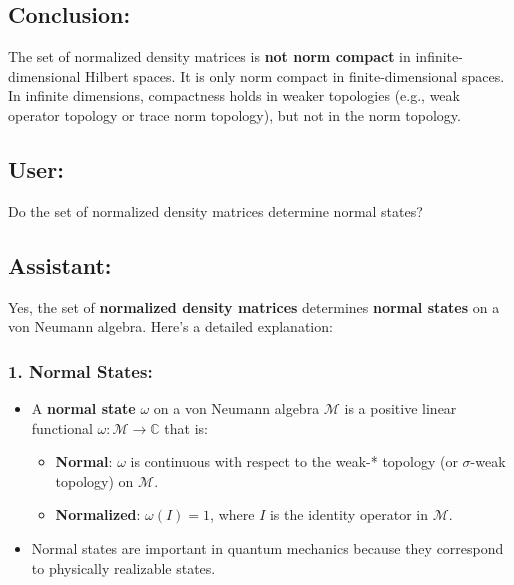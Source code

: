 \documentclass{article}
\begin{document}
\subsection*{Conclusion:}

The set of normalized density matrices is \textbf{not norm compact} in
infinite-dimensional Hilbert spaces. It is only norm compact in
finite-dimensional spaces. In infinite dimensions, compactness holds in
weaker topologies (e.g., weak operator topology or trace norm topology), but
not in the norm topology.

\subsection*{User:}

Do the set of normalized density matrices determine normal states?

\subsection*{Assistant:}

Yes, the set of \textbf{normalized density matrices} determines \textbf{%
normal states} on a von Neumann algebra. Here's a detailed explanation:

\subsubsection*{1. \textbf{Normal States}:}

\begin{itemize}
\item A \textbf{normal state} $\omega$ on a von Neumann algebra $\mathcal{M}$
is a positive linear functional $\omega: \mathcal{M} \to \mathbb{C}$ that
is: 

\begin{itemize}
\item \textbf{Normal}: $\omega$ is continuous with respect to the weak-*
topology (or $\sigma$-weak topology) on $\mathcal{M}$. 

\item \textbf{Normalized}: $\omega(I) = 1$, where $I$ is the identity
operator in $\mathcal{M}$. 
\end{itemize}

\item Normal states are important in quantum mechanics because they
correspond to physically realizable states.
\end{itemize}
\end{document}
